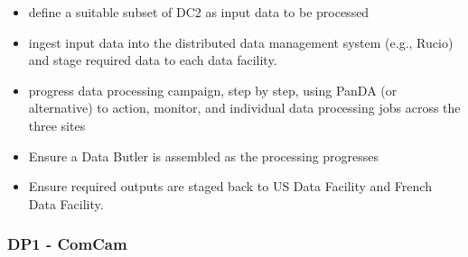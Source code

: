 \begin{itemize}

\item define a suitable subset of DC2 as input data to be processed

\item ingest input data into the distributed data management system (e.g., Rucio) and stage required data to each data facility.

\item progress data processing campaign, step by step, using PanDA (or alternative) to action, monitor, and individual data processing jobs across the three sites

\item Ensure a Data Butler is assembled as the processing progresses

\item Ensure required outputs are staged back to US Data Facility and French Data Facility.

\end{itemize}

\subsubsection{ \gls{DP1} - ComCam}

